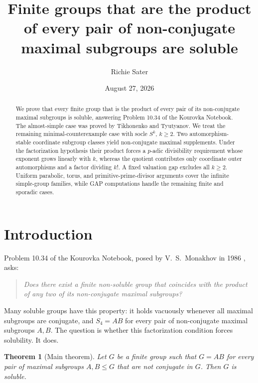 \documentclass[11pt]{amsart}
\title[Factorizations by non-conjugate maximal subgroups]{Finite groups
that are the product of every pair of non-conjugate maximal subgroups are
soluble}
\author{Richie Sater}
\date{August 27, 2026}
\newtheorem{theorem}{Theorem}[section]
\theoremstyle{definition}
\theoremstyle{remark}
\begin{document}
\begin{abstract}
We prove that every finite group that is the product of every pair of its
non-conjugate maximal subgroups is soluble, answering Problem 10.34 of the
Kourovka Notebook. The almost-simple case was proved by Tikhonenko and
Tyutyanov. We treat the remaining minimal-counterexample case with socle
$S^k$, $k\geq2$. Two automorphism-stable coordinate subgroup classes yield
non-conjugate maximal supplements. Under the factorization hypothesis their
product forces a $p$-adic divisibility requirement whose exponent grows
linearly with $k$, whereas the quotient contributes only coordinate outer
automorphisms and a factor dividing $k!$. A fixed valuation gap excludes all
$k\geq2$. Uniform parabolic, torus, and primitive-prime-divisor arguments
cover the infinite simple-group families, while GAP computations handle the
remaining finite and sporadic cases.
\end{abstract}

\maketitle

\section{Introduction}\label{sec:intro}

Problem 10.34 of the Kourovka Notebook, posed by V.~S.~Monakhov in 1986
\cite{Kourovka}, asks:

\begin{quote}
\emph{Does there exist a finite non-soluble group that coincides with the
product of any two of its non-conjugate maximal subgroups?}
\end{quote}

Many soluble groups have this property: it holds vacuously whenever all
maximal subgroups are conjugate, and $S_4=AB$ for every pair of non-conjugate
maximal subgroups $A,B$. The question is whether this factorization condition
forces solubility. It does.

\begin{theorem}[Main theorem]\label{thm:main}
Let $G$ be a finite group such that $G=AB$ for every pair of maximal
subgroups $A,B\leq G$ that are not conjugate in $G$. Then $G$ is soluble.
\end{theorem}
\end{document}
